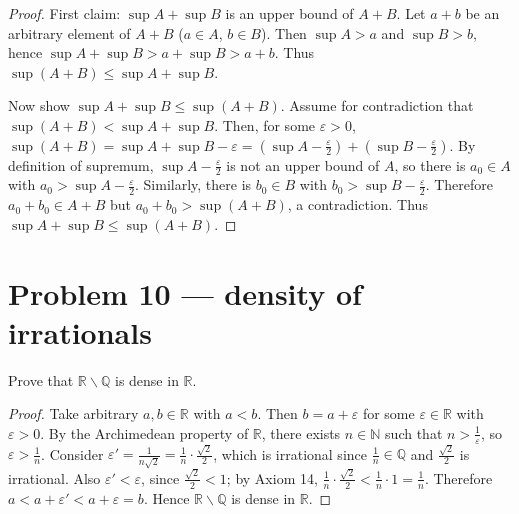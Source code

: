 \begin{proof}

First claim: \(\sup A + \sup B\) is an upper bound of \(A + B\). Let \(a + b\) be an arbitrary element of \(A + B\) (\(a \in A\), \(b \in B\)). Then \(\sup A > a\) and \(\sup B > b\), hence \(\sup A + \sup B > a + \sup B > a + b\). Thus \(\sup\left( {A + B} \right) \leq \sup A + \sup B\).

Now show \(\sup A + \sup B \leq \sup\left( {A + B} \right)\). Assume for contradiction that \(\sup\left( {A + B} \right) < \sup A + \sup B\). Then, for some \(\varepsilon > 0\), \(\sup\left( {A + B} \right) = \sup A + \sup B - \varepsilon = \left( {\sup A - \frac{\varepsilon}{2}} \right) + \left( {\sup B - \frac{\varepsilon}{2}} \right)\). By definition of supremum, \(\sup A - \frac{\varepsilon}{2}\) is not an upper bound of \(A\), so there is \(a_{0} \in A\) with \(a_{0} > \sup A - \frac{\varepsilon}{2}\). Similarly, there is \(b_{0} \in B\) with \(b_{0} > \sup B - \frac{\varepsilon}{2}\). Therefore \(a_{0} + b_{0} \in A + B\) but \(a_{0} + b_{0} > \sup\left( {A + B} \right)\), a contradiction. Thus \(\sup A + \sup B \leq \sup\left( {A + B} \right)\).

\end{proof}

\section{Problem 10 --- density of irrationals}

Prove that \(\mathbb{R} \smallsetminus \mathbb{Q}\) is dense in \(\mathbb{R}\).

\begin{proof}

Take arbitrary \(a,b \in \mathbb{R}\) with \(a < b\). Then \(b = a + \varepsilon\) for some \(\varepsilon \in \mathbb{R}\) with \(\varepsilon > 0\). By the Archimedean property of \(\mathbb{R}\), there exists \(n \in \mathbb{N}\) such that \(n > \frac{1}{\varepsilon}\), so \(\varepsilon > \frac{1}{n}\). Consider \(\varepsilon' = \frac{1}{n\sqrt{2}} = \frac{1}{n} \cdot \frac{\sqrt{2}}{2}\), which is irrational since \(\frac{1}{n} \in \mathbb{Q}\) and \(\frac{\sqrt{2}}{2}\) is irrational. Also \(\varepsilon' < \varepsilon\), since \(\frac{\sqrt{2}}{2} < 1\); by Axiom 14, \(\frac{1}{n} \cdot \frac{\sqrt{2}}{2} < \frac{1}{n} \cdot 1 = \frac{1}{n}\). Therefore \(a < a + \varepsilon' < a + \varepsilon = b\). Hence \(\mathbb{R} \smallsetminus \mathbb{Q}\) is dense in \(\mathbb{R}\).

\end{proof}

